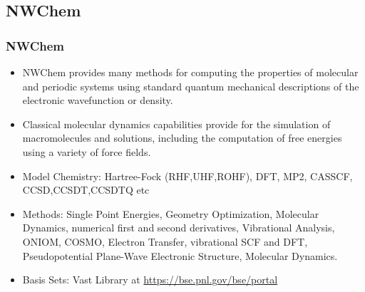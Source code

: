 \documentclass[slidestop,mathserif,compress,xcolor=svgnames]{beamer}
\begin{document}
\subsection{NWChem}
\begin{frame}
  \frametitle{\small NWChem}
  \begin{block}{}
    \begin{itemize}
      \item NWChem provides many methods for computing the properties of molecular and periodic systems using standard quantum mechanical descriptions of the electronic wavefunction or density.
      \item Classical molecular dynamics capabilities provide for the simulation of macromolecules and solutions, including the computation of free energies using a variety of force fields.
      \item Model Chemistry: Hartree-Fock (RHF,UHF,ROHF), DFT, MP2, CASSCF, CCSD,CCSDT,CCSDTQ etc
      \item Methods: Single Point Energies, Geometry Optimization, Molecular Dynamics, numerical first and second derivatives, Vibrational Analysis, ONIOM, COSMO, Electron Transfer, vibrational SCF and DFT, Pseudopotential Plane-Wave Electronic Structure, Molecular Dynamics.
      \item Basis Sets: Vast Library at \url{https://bse.pnl.gov/bse/portal}
    \end{itemize}
  \end{block}
\end{frame}
\end{document}
